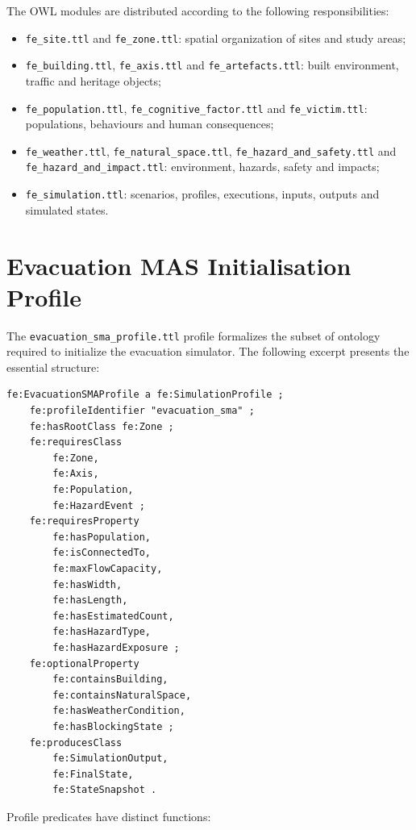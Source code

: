 \documentclass{article}
\begin{document}
The OWL modules are distributed according to the following responsibilities:

\begin{itemize}
\item \texttt{fe\_site.ttl} and \texttt{fe\_zone.ttl}: spatial organization of sites and study areas;
\item \texttt{fe\_building.ttl}, \texttt{fe\_axis.ttl} and \texttt{fe\_artefacts.ttl}: built environment, traffic and heritage objects;
\item \texttt{fe\_population.ttl}, \texttt{fe\_cognitive\_factor.ttl} and \texttt{fe\_victim.ttl}: populations, behaviours and human consequences;
\item \texttt{fe\_weather.ttl}, \texttt{fe\_natural\_space.ttl}, \texttt{fe\_hazard\_and\_safety.ttl} and \texttt{fe\_hazard\_and\_impact.ttl}: environment, hazards, safety and impacts;
\item \texttt{fe\_simulation.ttl}: scenarios, profiles, executions, inputs, outputs and simulated states.
\end{itemize}

\clearpage
\section{Evacuation MAS Initialisation Profile}

The \texttt{evacuation\_sma\_profile.ttl} profile formalizes the subset of ontology required to initialize the evacuation simulator. The following excerpt presents the essential structure:

\begin{lstlisting}[language=Turtle,caption={Simplified structure of the MAS profile}]
fe:EvacuationSMAProfile a fe:SimulationProfile ;
    fe:profileIdentifier "evacuation_sma" ;
    fe:hasRootClass fe:Zone ;
    fe:requiresClass
        fe:Zone,
        fe:Axis,
        fe:Population,
        fe:HazardEvent ;
    fe:requiresProperty
        fe:hasPopulation,
        fe:isConnectedTo,
        fe:maxFlowCapacity,
        fe:hasWidth,
        fe:hasLength,
        fe:hasEstimatedCount,
        fe:hasHazardType,
        fe:hasHazardExposure ;
    fe:optionalProperty
        fe:containsBuilding,
        fe:containsNaturalSpace,
        fe:hasWeatherCondition,
        fe:hasBlockingState ;
    fe:producesClass
        fe:SimulationOutput,
        fe:FinalState,
        fe:StateSnapshot .
\end{lstlisting}

Profile predicates have distinct functions:
\end{document}
